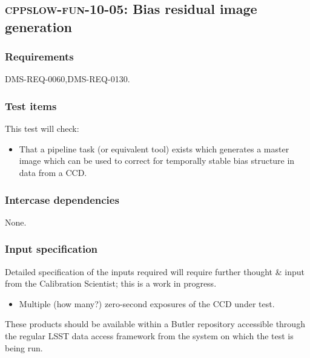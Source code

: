 \subsection{\textsc{cppslow-fun-10-05}: Bias residual image generation}
\label{cppslow-fun-10-05}

\subsubsection{Requirements}

DMS-REQ-0060,DMS-REQ-0130.

\subsubsection{Test items}

This test will check:

\begin{itemize}

  \item{That a pipeline task (or equivalent tool) exists which generates a
  master image which can be used to correct for temporally stable bias structure
  in data from a CCD.}

\end{itemize}

\subsubsection{Intercase dependencies}

None.

\subsubsection{Input specification}

\begin{note}
Detailed specification of the inputs required will require further thought \&
input from the Calibration Scientist; this is a work in progress.
\end{note}

\begin{itemize}

  \item{Multiple (how many?) zero-second exposures of the CCD under test.}

\end{itemize}

These products should be available within a Butler repository accessible
through the regular LSST data access framework from the system on which the test
is being run.

